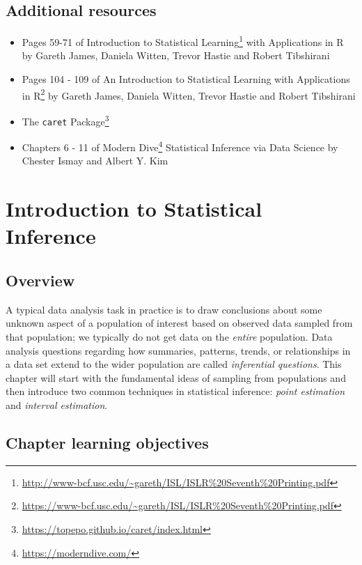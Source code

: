 \documentclass[
]{krantz}
\providecommand{\tightlist}{%
  \setlength{\itemsep}{0pt}\setlength{\parskip}{0pt}}
\renewcommand{\href}[2]{#2\footnote{\url{#1}}}
\begin{document}
\hypertarget{additional-resources-3}{%
\section{Additional resources}\label{additional-resources-3}}

\begin{itemize}
\tightlist
\item
  Pages 59-71 of \href{http://www-bcf.usc.edu/~gareth/ISL/ISLR\%20Seventh\%20Printing.pdf}{Introduction to Statistical Learning} with Applications in R by Gareth James, Daniela Witten, Trevor Hastie and Robert Tibshirani
\item
  Pages 104 - 109 of \href{https://www-bcf.usc.edu/~gareth/ISL/ISLR\%20Seventh\%20Printing.pdf}{An Introduction to Statistical Learning with Applications in R} by Gareth James, Daniela Witten, Trevor Hastie and Robert Tibshirani
\item
  \href{https://topepo.github.io/caret/index.html}{The \texttt{caret} Package}
\item
  Chapters 6 - 11 of \href{https://moderndive.com/}{Modern Dive} Statistical Inference via Data Science by Chester Ismay and Albert Y. Kim
\end{itemize}

\hypertarget{inference}{%
\chapter{Introduction to Statistical Inference}\label{inference}}

\hypertarget{overview-8}{%
\section{Overview}\label{overview-8}}

A typical data analysis task in practice is to draw conclusions about some unknown
aspect of a population of interest based on observed data sampled from that
population; we typically do not get data on the \emph{entire} population.
Data analysis questions regarding how summaries,
patterns, trends, or relationships in a data set
extend to the wider population are called \emph{inferential questions}. This chapter will start
with the fundamental ideas of sampling from populations and then introduce two common techniques in statistical inference: \emph{point estimation} and
\emph{interval estimation}.

\hypertarget{chapter-learning-objectives-9}{%
\section{Chapter learning objectives}\label{chapter-learning-objectives-9}}
\end{document}
